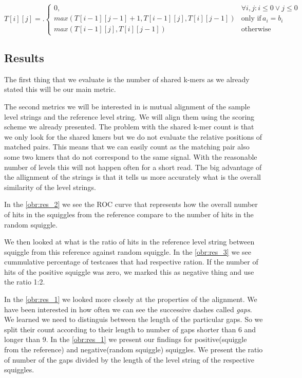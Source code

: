 \[
T[i][j] = \bigl.
  \begin{cases}
    0, & \forall i,j : i\leq 0 \lor j\leq 0 \\
    max(T[i-1][j-1] + 1, T[i-1][j], T[i][j-1]) & \text{only if} \, a_i = b_i \\ 
    max(T[i-1][j], T[i][j-1]) & \text{otherwise}
  \end{cases}
\]

\subsection{Results}

The first thing that we evaluate is the number of shared k-mers as we already
stated this will be our main metric.

The second metrics we will be interested in is mutual alignment of the sample
level strings and the reference level string. We will align them using the scoring
scheme we already presented. The problem with the shared k-mer count is that we only look
for the shared kmers but we do not evaluate the relative positions of matched pairs.
This means that we can easily count as the matching pair also some two kmers that
do not correspond to the same signal. With the reasonable number of levels this will
not happen often for a short read. The big advantage of the allignment of the strings
is that it tells us more accurately what is the overall similarity of the level strings.

In the \ref{obr:res_2} we see the ROC curve that represents how the overall number
of hits in the squiggles from the reference compare to the number of hits in the
random squiggle.

We then looked at what is the ratio of hits in the reference level string between squiggle
from this reference against random squiggle. In the \ref{obr:res_3} we see cummulative percentage
of testcases that had respective ration. If the number of hits of the positive squiggle
was zero, we marked this as negative thing and use the ratio 1:2.

In the \ref{obr:res_1} we looked more closely at the properties of the alignment. We
have been interested in how often we can see the successive dashes called \textit{gaps}.
We learned we need to distinguis between the length of the particular gaps. So we split
their count according to their length to number of gaps shorter than 6 and longer than 9.
In the \ref{obr:res_1} we present our findings for positive(squiggle from the reference)
and negative(random squiggle) squiggles. We present the ratio of number of the gaps divided
by the length of the level string of the respective squiggles.

